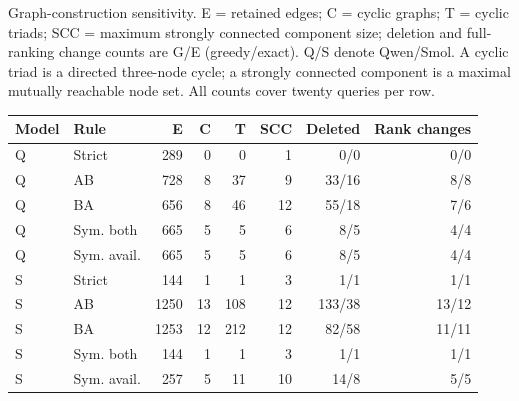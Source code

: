 \begin{supplementtable}\caption{Graph-construction sensitivity. E = retained edges; C = cyclic graphs; T = cyclic triads; SCC = maximum strongly connected component size; deletion and full-ranking change counts are G/E (greedy/exact). Q/S denote Qwen/Smol. A cyclic triad is a directed three-node cycle; a strongly connected component is a maximal mutually reachable node set. All counts cover twenty queries per row.}\label{tab:si-construction}
\sncstable
\begin{tabularx}{\linewidth}{@{}lYrrrrrr@{}}\toprule
Model & Rule & E & C & T & SCC & Deleted & Rank changes \\\midrule
Q & Strict & 289 & 0 & 0 & 1 & 0/0 & 0/0 \\
Q & AB & 728 & 8 & 37 & 9 & 33/16 & 8/8 \\
Q & BA & 656 & 8 & 46 & 12 & 55/18 & 7/6 \\
Q & Sym. both & 665 & 5 & 5 & 6 & 8/5 & 4/4 \\
Q & Sym. avail. & 665 & 5 & 5 & 6 & 8/5 & 4/4 \\
S & Strict & 144 & 1 & 1 & 3 & 1/1 & 1/1 \\
S & AB & 1250 & 13 & 108 & 12 & 133/38 & 13/12 \\
S & BA & 1253 & 12 & 212 & 12 & 82/58 & 11/11 \\
S & Sym. both & 144 & 1 & 1 & 3 & 1/1 & 1/1 \\
S & Sym. avail. & 257 & 5 & 11 & 10 & 14/8 & 5/5 \\
\bottomrule\end{tabularx}\end{supplementtable}